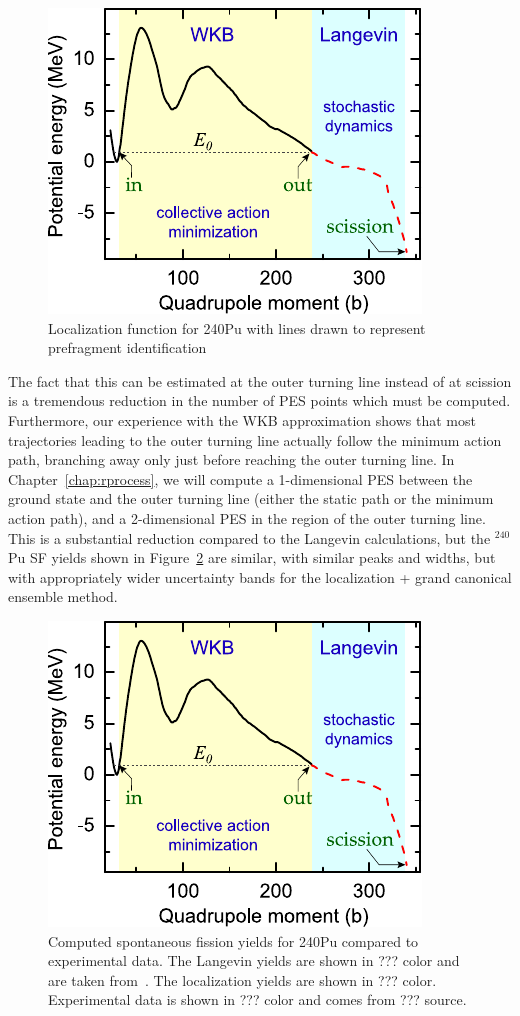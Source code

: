 \begin{figure}
	\centering
	\includegraphics[width=0.5\linewidth]{TeX_files/methods_overview}
	\caption[Localization function for 240Pu with lines drawn to represent prefragment identification]{Localization function for 240Pu with lines drawn to represent prefragment identification}
	\label{fig:methods240Pulocali}
\end{figure}

The fact that this can be estimated at the outer turning line instead of at scission is a tremendous reduction in the number of PES points which must be computed. Furthermore, our experience with the WKB approximation shows that most trajectories leading to the outer turning line actually follow the minimum action path, branching away only just before reaching the outer turning line. In Chapter~\ref{chap:rprocess}, we will compute a 1-dimensional PES between the ground state and the outer turning line (either the static path or the minimum action path), and a 2-dimensional PES in the region of the outer turning line. This is a substantial reduction compared to the Langevin calculations, but the $^{240}$Pu SF yields shown in Figure~\ref{fig:methods240Puyield} are similar, with similar peaks and widths, but with appropriately wider uncertainty bands for the localization + grand canonical ensemble method.

\begin{figure}
	\centering
	\includegraphics[width=0.5\linewidth]{TeX_files/methods_overview}
	\caption[Computed spontaneous fission yields for 240Pu compared to experimental data. The Langevin yields are shown in ??? color and are taken from~\cite{Sadhukhan2016}. The localization yields are shown in ??? color. Experimental data is shown in ??? color and comes from ??? source.]{Computed spontaneous fission yields for 240Pu compared to experimental data. The Langevin yields are shown in ??? color and are taken from~\cite{Sadhukhan2016}. The localization yields are shown in ??? color. Experimental data is shown in ??? color and comes from ??? source.}
	\label{fig:methods240Puyield}
\end{figure}